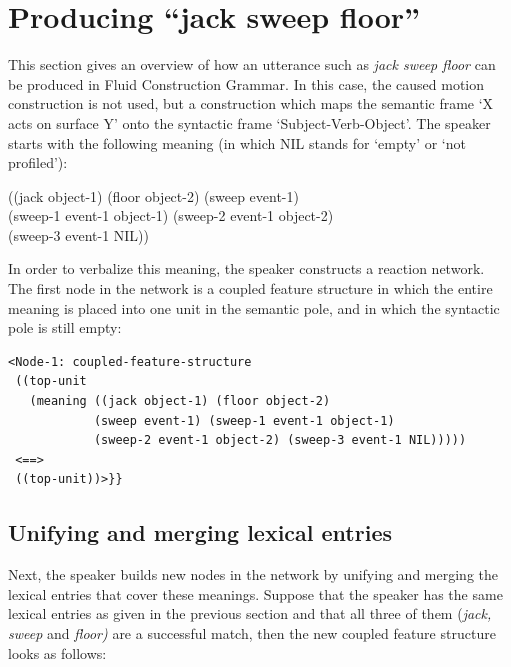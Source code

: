 \section{Producing ``jack sweep floor''}

This section gives an overview of how an utterance such as {\em jack sweep floor} can be produced in Fluid Construction Grammar. In this case, the caused motion construction is not used, but a construction which maps the semantic frame `X acts on surface Y' onto the syntactic frame `Subject-Verb-Object'. The speaker starts with the following meaning (in which NIL stands for `empty' or `not profiled'):

\ea
((jack object-1) (floor object-2) (sweep event-1) 
\\ \hspace*{3mm}(sweep-1 event-1 object-1) (sweep-2 event-1 object-2) 
\\ \hspace*{3mm}(sweep-3 event-1 NIL))
\z

In order to verbalize this meaning, the speaker constructs a reaction network. The first node in the network is a coupled feature structure in which the entire meaning is placed into one unit in the semantic pole, and in which the syntactic pole is still empty:


\ea
\begin{lstlisting}
<Node-1: coupled-feature-structure
 ((top-unit
   (meaning ((jack object-1) (floor object-2)
            (sweep event-1) (sweep-1 event-1 object-1)
            (sweep-2 event-1 object-2) (sweep-3 event-1 NIL)))))
 <==>
 ((top-unit))>}}

\end{lstlisting}
\z
\subsection{Unifying and merging lexical entries}

Next, the speaker builds new nodes in the network by unifying and merging the lexical entries that cover these meanings. Suppose that the speaker has the same lexical entries as given in the previous section and that all three of them ({\em jack, sweep} and {\em floor)} are a successful match, then the new coupled feature structure looks as follows:


